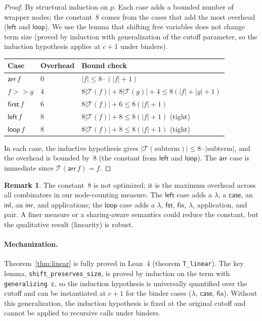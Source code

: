 \documentclass[11pt,a4paper]{article}
\theoremstyle{definition}
\newtheorem{remark}[theorem]{Remark}
\theoremstyle{remark}
\newcommand{\arr}{\mathsf{arr}}
\newcommand{\comp}{\mathbin{>\!\!>}}
\newcommand{\first}{\mathsf{first}}
\newcommand{\leftc}{\mathsf{left}}
\newcommand{\loopop}{\mathsf{loop}}
\newcommand{\fix}{\mathsf{fix}}
\newcommand{\T}{\mathcal{T}}
\newcommand{\size}[1]{\lvert #1 \rvert}
\begin{document}
\begin{proof}
By structural induction on $p$. Each case adds a bounded number of wrapper
nodes; the constant~$8$ comes from the cases that add the most overhead
($\leftc$ and $\loopop$). We use the lemma that shifting free variables does
not change term size (proved by induction with generalization of the cutoff
parameter, so the induction hypothesis applies at $c+1$ under binders).

\smallskip
\begin{center}
\begin{tabular}{lll}
\toprule
Case & Overhead & Bound check \\
\midrule
$\arr\,f$ & $0$ & $\size{f} \leq 8 \cdot (\size{f} + 1)$ \\
$f \comp g$ & $4$ & $8\size{\T(f)} + 8\size{\T(g)} + 4 \leq 8(\size{f}+\size{g}+1)$ \\
$\first\,f$ & $6$ & $8\size{\T(f)} + 6 \leq 8(\size{f}+1)$ \\
$\leftc\,f$ & $8$ & $8\size{\T(f)} + 8 \leq 8(\size{f}+1)$ (tight) \\
$\loopop\,f$ & $8$ & $8\size{\T(f)} + 8 \leq 8(\size{f}+1)$ (tight) \\
\bottomrule
\end{tabular}
\end{center}

\smallskip
In each case, the inductive hypothesis gives
$\size{\T(\text{subterm})} \leq 8\cdot\size{\text{subterm}}$, and the
overhead is bounded by~$8$ (the constant from $\leftc$ and $\loopop$). The
$\arr$ case is immediate since $\T(\arr\,f) = f$.
\end{proof}

\begin{remark}
The constant~$8$ is not optimized; it is the maximum overhead across all
combinators in our node-counting measure. The $\leftc$ case adds a
$\lambda$, a $\mathsf{case}$, an $\mathsf{inl}$, an $\mathsf{inr}$, and
applications; the $\loopop$ case adds a $\lambda$, $\mathsf{fst}$, $\fix$,
$\lambda$, application, and pair. A finer measure or a sharing-aware
semantics could reduce the constant, but the qualitative result
(linearity) is robust.
\end{remark}

\paragraph{Mechanization.}
Theorem~\ref{thm:linear} is fully proved in Lean~4 (theorem \texttt{T\_linear}).
The key lemma, \texttt{shift\_preserves\_size}, is proved by induction on
the term with \texttt{generalizing c}, so the induction hypothesis is
universally quantified over the cutoff and can be instantiated at $c+1$
for the binder cases ($\lambda$, $\mathsf{case}$, $\fix$). Without this
generalization, the induction hypothesis is fixed at the original cutoff
and cannot be applied to recursive calls under binders.
\end{document}
